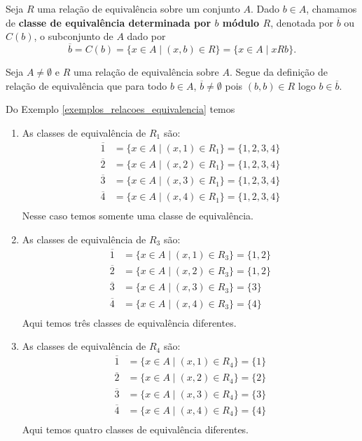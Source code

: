 \begin{definicao}
	Seja $R$ uma rela{\c c}{\~a}o de equival{\^e}ncia sobre um conjunto $A$. Dado $b \in A$, chamamos de \textbf{classe de equival{\^e}ncia determinada por $b$ m{\'o}dulo $R$}, denotada por $\overline{b}$ ou $C(b)$, o subconjunto de $A$ dado por
	\[
		\overline{b} = C(b) = \{x \in A \mid (x,b) \in R\} = \{x \in A \mid xRb\}.
	\]
\end{definicao}

\begin{observacao}
	Seja $A \ne \emptyset$ e $R$ uma relação de equivalência sobre $A$. Segue da definição de relação de equivalência que para todo $b \in A$, $\overline{b} \ne \emptyset$ pois $(b,b) \in R$ logo $b \in \overline{b}$.
\end{observacao}

\begin{exemplos}\label{exemplos_classes_equivalencia}
	Do Exemplo \ref{exemplos_relacoes_equivalencia} temos
	\begin{enumerate}[label={\arabic*})]
		\item As classes de equivalência de $R_1$ são:
		\begin{align*}
			\overline{1} &= \{x \in A \mid (x,1) \in R_1\} = \{1,2,3,4\}\\
			\overline{2} &= \{x \in A \mid (x,2) \in R_1\} = \{1,2,3,4\}\\
			\overline{3} &= \{x \in A \mid (x,3) \in R_1\} = \{1,2,3,4\}\\
			\overline{4} &= \{x \in A \mid (x,4) \in R_1\} = \{1,2,3,4\}\\
		\end{align*}
		Nesse caso temos somente uma classe de equivalência.

		\item As classes de equivalência de $R_3$ são:
		\begin{align*}
			\overline{1} &= \{x \in A \mid (x,1) \in R_3\} = \{1,2\}\\
			\overline{2} &= \{x \in A \mid (x,2) \in R_3\} = \{1,2\}\\
			\overline{3} &= \{x \in A \mid (x,3) \in R_3\} = \{3\}\\
			\overline{4} &= \{x \in A \mid (x,4) \in R_3\} = \{4\}\\
		\end{align*}
		Aqui temos três classes de equivalência diferentes.

		\item As classes de equivalência de $R_4$ são:
		\begin{align*}
			\overline{1} &= \{x \in A \mid (x,1) \in R_4\} = \{1\}\\
			\overline{2} &= \{x \in A \mid (x,2) \in R_4\} = \{2\}\\
			\overline{3} &= \{x \in A \mid (x,3) \in R_4\} = \{3\}\\
			\overline{4} &= \{x \in A \mid (x,4) \in R_4\} = \{4\}\\
		\end{align*}
		Aqui temos quatro classes de equivalência diferentes.


\end{enumerate}
\end{exemplos}
